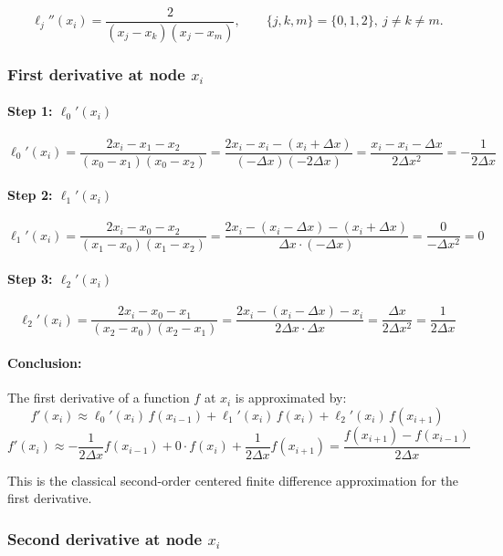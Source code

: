 \[
\ell_j''(x_i) = \frac{2}{(x_j - x_k)(x_j - x_m)} , \qquad \{j,k,m\} = \{0,1,2\},\ j \ne k \ne m.
\]

\newpage

\subsubsection{First derivative at node \(x_i\)}

\paragraph{Step 1: \(\ell_0'(x_i)\)}
\[
\ell_0'(x_i) = \frac{2x_i - x_1 - x_2}{(x_0 - x_1)(x_0 - x_2)} = \frac{2x_i - x_i - (x_i + \Delta x)}{(-\Delta x)(-2\Delta x)} = \frac{x_i - x_i - \Delta x}{2\Delta x^2} = -\frac{1}{2\Delta x}
\]

\paragraph{Step 2: \(\ell_1'(x_i)\)}
\[
\ell_1'(x_i) = \frac{2x_i - x_0 - x_2}{(x_1 - x_0)(x_1 - x_2)} = \frac{2x_i - (x_i - \Delta x) - (x_i + \Delta x)}{\Delta x \cdot (-\Delta x)} = \frac{0}{-\Delta x^2} = 0
\]

\paragraph{Step 3: \(\ell_2'(x_i)\)}
\[
\ell_2'(x_i) = \frac{2x_i - x_0 - x_1}{(x_2 - x_0)(x_2 - x_1)} = \frac{2x_i - (x_i - \Delta x) - x_i}{2\Delta x \cdot \Delta x} = \frac{\Delta x}{2\Delta x^2} = \frac{1}{2\Delta x}
\]

\paragraph{Conclusion:}

The first derivative of a function \(f\) at \(x_i\) is approximated by:
\[
f'(x_i) \approx \ell_0'(x_i)\,f(x_{i-1}) + \ell_1'(x_i)\,f(x_i) + \ell_2'(x_i)\,f(x_{i+1})
\]
\[
f'(x_i) \approx -\frac{1}{2\Delta x} f(x_{i-1}) + 0 \cdot f(x_i) + \frac{1}{2\Delta x} f(x_{i+1})
= \frac{f(x_{i+1}) - f(x_{i-1})}{2\Delta x}
\]


This is the classical second-order centered finite difference approximation for the first derivative.

\subsubsection{Second derivative at node \(x_i\)}


